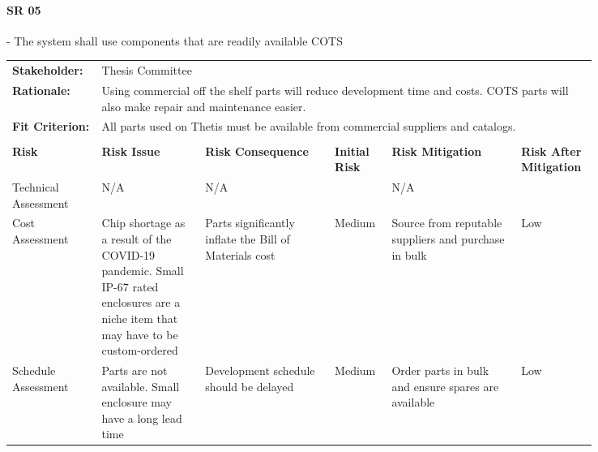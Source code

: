 \begin{landscape}


\paragraph*{SR 05} - The system shall use components that are readily available COTS

{\fontsize{8pt}{8pt}\selectfont
\begin{longtable}{| p{0.12\linewidth} | p{0.16\linewidth} |  p{0.20\linewidth} | p{0.08\linewidth} | p{0.20\linewidth} | p{0.08\linewidth} |}
	\hline \endlastfoot
	
	\hline
	\rowcolor[gray]{0.8}
	\multicolumn{6}{|c|}{ } \\
	\hline
	\textbf{Stakeholder:} & \multicolumn{5}{|l|}{Thesis Committee} \\
	\hline
	\textbf{Rationale:} & \multicolumn{5}{|p{0.8\linewidth}|}{Using commercial off the shelf parts will reduce development time and costs. COTS parts will also make repair and maintenance easier.} \\
	\hline
	\textbf{Fit Criterion:} & \multicolumn{5}{|p{0.8\linewidth}|}{All parts used on Thetis must be available from commercial suppliers and catalogs.} \\
	\hline
	\rowcolor[gray]{0.8}
	\multicolumn{6}{|c|}{ } \\
	\hline
	\textbf{Risk} & \textbf{Risk Issue} & \textbf{Risk Consequence} & \textbf{Initial Risk} & \textbf{Risk Mitigation} & \textbf{Risk \newline After \newline Mitigation} \\
	\hline
	Technical \newline Assessment & N/A & N/A & \cellcolor[gray]{0.8} & N/A & \cellcolor[gray]{0.8} \\
	\hline
	Cost \newline Assessment & Chip shortage as a result of the COVID-19 pandemic. \newline Small IP-67 rated enclosures are a niche item that may have to be custom-ordered & Parts significantly inflate the Bill of Materials cost & \cellcolor{yellow} Medium & Source from reputable suppliers and purchase in bulk & \cellcolor{green} Low \\
	\hline
	Schedule \newline Assessment & Parts are not available. \newline Small enclosure may have a long lead time & Development schedule should be delayed & \cellcolor{yellow} Medium & Order parts in bulk and ensure spares are available & \cellcolor{green} Low \\

\end{longtable}}
\end{landscape}

